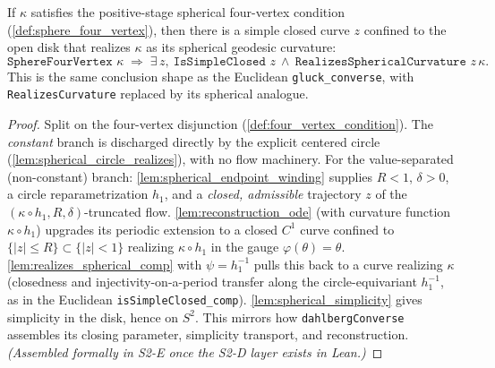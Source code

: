\begin{theorem}
  \label{thm:spherical_converse_pos}
  If $\kappa$ satisfies the positive-stage spherical four-vertex condition
  (\cref{def:sphere_four_vertex}), then there is a simple closed curve $z$ confined to the
  open disk that realizes $\kappa$ as its spherical geodesic curvature:
  \[
    \texttt{SphereFourVertex }\kappa \;\Longrightarrow\;
    \exists\,z,\ \texttt{IsSimpleClosed }z\ \wedge\ \texttt{RealizesSphericalCurvature }z\,\kappa .
  \]
  This is the same conclusion shape as the Euclidean \texttt{gluck\_converse}, with
  \texttt{RealizesCurvature} replaced by its spherical analogue.
\end{theorem}

\begin{proof}
        \leanok
  Split on the four-vertex disjunction (\cref{def:four_vertex_condition}). The
  \emph{constant} branch is discharged directly by the explicit centered circle
  (\cref{lem:spherical_circle_realizes}), with no flow machinery. For the value-separated
  (non-constant) branch: \cref{lem:spherical_endpoint_winding} supplies $R<1$,
  $\delta>0$, a circle reparametrization $h_1$, and a \emph{closed, admissible}
  trajectory $z$ of the $(\kappa\circ h_1,R,\delta)$-truncated flow.
  \cref{lem:reconstruction_ode} (with curvature function $\kappa\circ h_1$) upgrades its
  periodic extension to a closed $C^1$ curve confined to $\{|z|\le R\}\subset\{|z|<1\}$
  realizing $\kappa\circ h_1$ in the gauge $\varphi(\theta)=\theta$.
  \cref{lem:realizes_spherical_comp} with $\psi=h_1^{-1}$ pulls this back to a curve
  realizing $\kappa$ (closedness and injectivity-on-a-period transfer along the
  circle-equivariant $h_1^{-1}$, as in the Euclidean
  \texttt{isSimpleClosed\_comp}). \cref{lem:spherical_simplicity} gives simplicity in
  the disk, hence on $S^2$. This mirrors how \texttt{dahlbergConverse} assembles its
  closing parameter, simplicity transport, and reconstruction. \emph{(Assembled formally
  in S2-E once the S2-D layer exists in Lean.)}
\end{proof}

